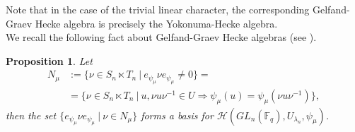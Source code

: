 \documentclass[12pt,reqno]{amsart}
\newtheorem{prop}[thm]{Proposition}
\theoremstyle{definition}
\theoremstyle{remark}
\numberwithin{equation}{section}
\newcommand{\GL}[1]{GL_{#1}(\mathbb{F}_q)}
\def\IM#1{\textcolor[rgb]{0.00,0.00,0.75}{[I: #1]}}
\begin{document}
Note that in the case of the trivial linear character, the corresponding Gelfand-Graev Hecke algebra is precisely the Yokonuma-Hecke algebra.\\

We recall the following fact about Gelfand-Graev Hecke algebras (see \cite[Proposition 11.30]{CR}).\\


\begin{prop}\label{GGH_basis}
    Let 
    \begin{align*}
        N_{\mu}&:=\{\nu \in S_n \ltimes T_n\ |\ e_{\psi_{\mu}}\nu e_{\psi_{\mu}}\neq 0\}=\\
        &=\{\nu\in S_n \ltimes T_n\ | \ u,\nu u\nu^{-1}\in U \Rightarrow \psi_{\mu}(u)=\psi_{\mu}(\nu u\nu^{-1})\},
    \end{align*}
    then the set $\{e_{\psi_{\mu}} \nu e_{\psi_{\mu}}\ |\ \nu \in N_{\mu}\}$ forms a basis for $\mathcal{H}(\GL{n},U_{\lambda_n},\psi_{\mu})$.
\end{prop}






\end{document}

